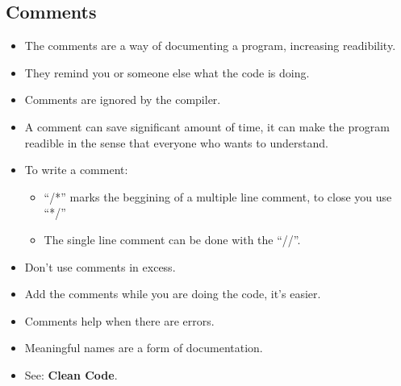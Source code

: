 \subsection{Comments}
\begin{itemize}
    \item The comments are a way of documenting a program, increasing readibility.
    \item They remind you or someone else what the code is doing.
    \item Comments are ignored by the compiler.
    \item A comment can save significant amount of time, it can make the program readible in the sense that everyone who wants to understand.
    \item To write a comment:
        \begin{itemize}
            \item ``/*'' marks the beggining of a multiple line comment, to close you use ``*/''
            \item The single line comment can be done with the ``//''. 
        \end{itemize}
    \item Don't use comments in excess.
    \item Add the comments while you are doing the code, it's easier.
    \item Comments help when there are errors.
    \item Meaningful names are a form of documentation.
    \item See: \textbf{Clean Code}.
\end{itemize}
